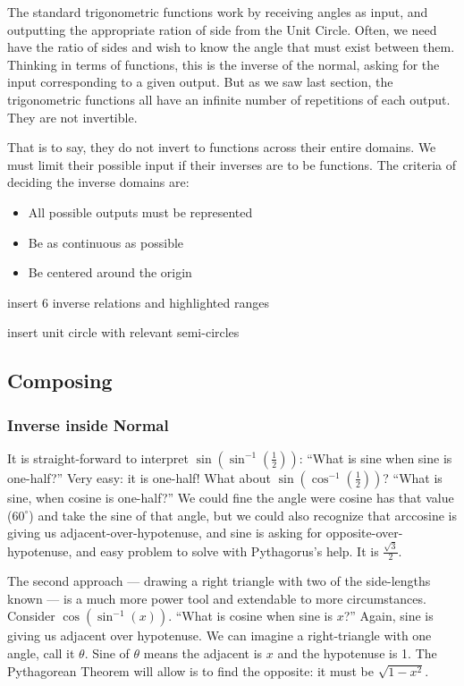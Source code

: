 


The standard trigonometric functions work by receiving angles as input, and outputting
the appropriate ration of side from the Unit Circle.  Often, we need have the ratio of sides
and wish to know the angle that must exist between them.  Thinking in terms of functions,
this is the inverse of the normal, asking for the input corresponding to a given output.
But as we saw last section, the trigonometric functions all have an infinite number of
repetitions of each output.  They are not invertible.

That is to say, they do not invert to functions across their entire domains.  We must limit
their possible input if their inverses are to be functions.  The criteria of deciding the
inverse domains are:
\begin{itemize}
\item All possible outputs must be represented
\item Be as continuous as possible
\item Be centered around the origin
\end{itemize}

insert 6 inverse relations and highlighted ranges

insert unit circle with relevant semi-circles

\subsection{Composing}
\subsubsection{Inverse inside Normal}
It is straight-forward to interpret $\sin(\sin^{-1}(\frac{1}{2}))$:  ``What is sine when
sine is one-half?''  Very easy: it is one-half!  What about $\sin(\cos^{-1}(\frac{1}{2}))$?
``What is sine, when cosine is one-half?''  We could fine the angle were cosine has that
value ($60^\circ$) and take the sine of that angle, but we could also recognize that
arccosine is giving us adjacent-over-hypotenuse, and sine is asking for opposite-over-hypotenuse,
and easy problem to solve with Pythagorus's help.  It is $\frac{\sqrt{3}}{2}$.

The second approach --- drawing a right triangle with two of the side-lengths known --- is
a much more power tool and extendable to more circumstances.  Consider 
$\cos(\sin^{-1}(x))$.  ``What is cosine when sine is $x$?''  Again, sine is giving us
adjacent over hypotenuse.  We can imagine a right-triangle with one angle, call it
$\theta$.  Sine of $\theta$ means the adjacent is $x$ and the hypotenuse is 1.
The Pythagorean Theorem will allow is to find the opposite: it must be $\sqrt{1-x^2}$.

